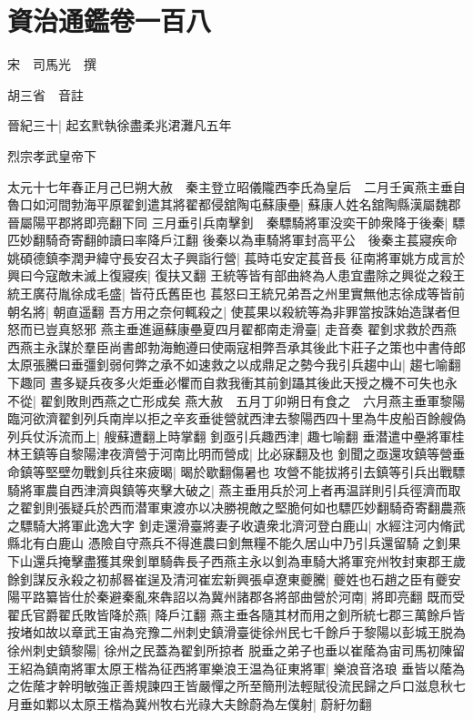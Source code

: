 \section{資治通鑑卷一百八}
宋　司馬光　撰

胡三省　音註

晉紀三十|{
	起玄黓執徐盡柔兆涒灘凡五年}


烈宗孝武皇帝下

太元十七年春正月己巳朔大赦　秦主登立昭儀隴西李氏為皇后　二月壬寅燕主垂自魯口如河間勃海平原翟釗遣其將翟都侵舘陶屯蘇康壘|{
	蘇康人姓名舘陶縣漢屬魏郡晉屬陽平郡將即亮翻下同}
三月垂引兵南擊釗　秦驃騎將軍没奕干帥衆降于後秦|{
	驃匹妙翻騎奇寄翻帥讀曰率降戶江翻}
後秦以為車騎將軍封高平公　後秦主萇寢疾命姚碩德鎮李潤尹緯守長安召太子興詣行營|{
	萇時屯安定萇音長}
征南將軍姚方成言於興曰今寇敵未滅上復寢疾|{
	復扶又翻}
王統等皆有部曲終為人患宜盡除之興從之殺王統王廣苻胤徐成毛盛|{
	皆苻氏舊臣也}
萇怒曰王統兄弟吾之州里實無他志徐成等皆前朝名將|{
	朝直遥翻}
吾方用之奈何輒殺之|{
	使萇果以殺統等為非罪當按誅始造謀者但怒而已豈真怒邪}
燕主垂進逼蘇康壘夏四月翟都南走滑臺|{
	走音奏}
翟釗求救於西燕西燕主永謀於羣臣尚書郎勃海鮑遵曰使兩寇相弊吾承其後此卞莊子之策也中書侍郎太原張騰曰垂彊釗弱何弊之承不如速救之以成鼎足之勢今我引兵趨中山|{
	趨七喻翻下趣同}
晝多疑兵夜多火炬垂必懼而自救我衝其前釗躡其後此天授之機不可失也永不從|{
	翟釗敗則西燕之亡形成矣}
燕大赦　五月丁卯朔日有食之　六月燕主垂軍黎陽臨河欲濟翟釗列兵南岸以拒之辛亥垂徙營就西津去黎陽西四十里為牛皮船百餘艘偽列兵仗泝流而上|{
	艘蘇遭翻上時掌翻}
釗亟引兵趣西津|{
	趣七喻翻}
垂潜遣中壘將軍桂林王鎮等自黎陽津夜濟營于河南比明而營成|{
	比必寐翻及也}
釗聞之亟還攻鎮等營垂命鎮等堅壁勿戰釗兵往來疲暍|{
	暍於歇翻傷暑也}
攻營不能拔將引去鎮等引兵出戰驃騎將軍農自西津濟與鎮等夾擊大破之|{
	燕主垂用兵於河上者再温詳則引兵徑濟而取之翟釗則張疑兵於西而潜軍東渡亦以决勝視敵之堅脆何如也驃匹妙翻騎奇寄翻農燕之驃騎大將軍此逸大字}
釗走還滑臺將妻子收遺衆北濟河登白鹿山|{
	水經注河内脩武縣北有白鹿山}
憑險自守燕兵不得進農曰釗無糧不能久居山中乃引兵還留騎之釗果下山還兵掩擊盡獲其衆釗單騎犇長子西燕主永以釗為車騎大將軍兖州牧封東郡王歲餘釗謀反永殺之初郝晷崔逞及清河崔宏新興張卓遼東夔騰|{
	夔姓也石趙之臣有夔安}
陽平路纂皆仕於秦避秦亂來犇詔以為冀州諸郡各將部曲營於河南|{
	將即亮翻}
既而受翟氏官爵翟氏敗皆降於燕|{
	降戶江翻}
燕主垂各隨其材而用之釗所統七郡三萬餘戶皆按堵如故以章武王宙為兖豫二州刺史鎮滑臺徙徐州民七千餘戶于黎陽以彭城王脱為徐州刺史鎮黎陽|{
	徐州之民蓋為翟釗所掠者}
脱垂之弟子也垂以崔䕃為宙司馬初陳留王紹為鎮南將軍太原王楷為征西將軍樂浪王温為征東將軍|{
	樂浪音洛琅}
垂皆以䕃為之佐䕃才幹明敏強正善規諫四王皆嚴憚之所至簡刑法輕賦役流民歸之戶口滋息秋七月垂如鄴以太原王楷為冀州牧右光祿大夫餘蔚為左僕射|{
	蔚紆勿翻}
